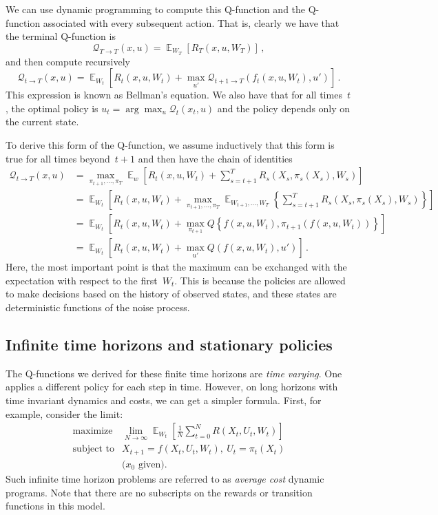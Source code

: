 \documentclass{tufte-book}
\begin{document}
We can use dynamic programming to compute this Q-function and the
Q-function associated with every subsequent action. That is, clearly we
have that the terminal Q-function is \[
    \mathcal{Q}_{T\rightarrow T}(x,u) = \mathop\mathbb{E}_{W_T}\left[ R_T(x,u,W_T) \right]\,,
\] and then compute recursively \[
    \mathcal{Q}_{t\rightarrow T}(x,u) = \mathop\mathbb{E}_{W_t}\left[ R_t(x,u,W_t) +  \max_{u'} \mathcal{Q}_{t+1 \rightarrow T}(f_t(x,u,W_t),u')\right]\,.
\] This expression is known as Bellman's equation. We also have that for
all times~\(t\), the optimal policy is
\(u_t = \arg\max_u \mathcal{Q}_t (x_t,u)\) and the policy depends only
on the current state.

To derive this form of the Q-function, we assume inductively that this
form is true for all times beyond~\(t+1\) and then have the chain of
identities \[
\begin{aligned}
    \mathcal{Q}_{t\rightarrow T}(x,u) &= \max_{\pi_{t+1},\ldots,\pi_T} \mathop\mathbb{E}_{w}\left[R_t(x,u,W_t) +  \sum_{s=t+1}^T R_s(X_s,\pi_{s}(X_s),W_s)\right]\\
&=  \mathop\mathbb{E}_{W_t}\left[R_t(x,u,W_t) +  
\max_{\pi_{t+1},\ldots,\pi_T}\mathop\mathbb{E}_{W_{t+1},\ldots,W_T} \left\{
\sum_{s=t+1}^T R_s(X_s,\pi_{s}(X_s),W_s) \right\}\right]\\
 &=\mathop\mathbb{E}_{W_t}\left[R_t(x,u,W_t) +     \max_{\pi_{t+1}} Q\left\{f(x,u,W_t),\pi_{t+1}(f(x,u,W_t))\right\}\right]\\
 &= \mathop\mathbb{E}_{W_t}\left[R_t(x,u,W_t) +    \max_{u'} Q(f(x,u,W_t),u')\right]\,.
\end{aligned}
\] Here, the most important point is that the maximum can be exchanged
with the expectation with respect to the first~\(W_t\). This is because
the policies are allowed to make decisions based on the history of
observed states, and these states are deterministic functions of the
noise process.

\hypertarget{infinite-time-horizons-and-stationary-policies}{%
\subsection{Infinite time horizons and stationary
policies}\label{infinite-time-horizons-and-stationary-policies}}

The Q-functions we derived for these finite time horizons are \emph{time
varying}. One applies a different policy for each step in time. However,
on long horizons with time invariant dynamics and costs, we can get a
simpler formula. First, for example, consider the limit: \[
\begin{array}{ll}
\text{maximize} & \lim_{N\rightarrow \infty}  \mathop\mathbb{E}_{W_t}[ \frac{1}{N} \sum_{t=0}^N R(X_t,U_t,W_t) ]\\
\text{subject to} & X_{t+1} = f(X_t, U_t, W_t),~U_t=\pi_t(X_t)\\
& \text{($x_0$ given).}
\end{array}
\] Such infinite time horizon problems are referred to as \emph{average
cost} dynamic programs. Note that there are no subscripts on the rewards
or transition functions in this model.
\end{document}
